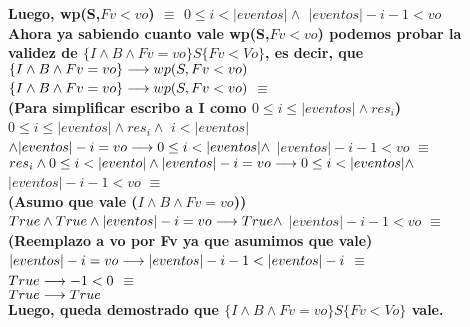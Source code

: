 \documentclass[10pt,a4paper]{article}
\begin{document}
\begin{flushleft}
\begin{enumerate}
	\vspace{2mm}
	\textbf{Luego, wp(S,$Fv<vo$) $\equiv$ $0 \leq i <|eventos| \wedge$ $|eventos|-i-1<vo$}\\
	\vspace{6mm}
	\textbf{Ahora ya sabiendo cuanto vale wp(S,$Fv<vo$) podemos probar la validez de $\{ I \wedge B \wedge Fv= vo \}S\{ Fv<Vo \}$, es decir, que $\{ I \wedge B \wedge Fv= vo \} \longrightarrow wp(S,Fv<vo)$} \\
	\vspace{2mm}
	$\{ I \wedge B \wedge Fv= vo \} \longrightarrow wp(S,Fv<vo)$ $ \equiv$ \\
	\vspace{2mm}
	\textbf{(Para simplificar escribo a I como $0\leq i \leq |eventos| \wedge res_i$)}\\
	\vspace{2mm}
	$0\leq i \leq |eventos| \wedge res_i \wedge $ $i < |eventos|$ $\wedge |eventos|-i = vo \implica 0 \leq i <|eventos| \wedge$ $|eventos|-i-1<vo$ $\equiv$ \\
	\vspace{2mm}
	$res_i \wedge 0\leq i<|evento| \wedge |eventos|-i = vo \implica 0 \leq i <|eventos| \wedge$ $|eventos|-i-1<vo$ $\equiv$ \\
	\vspace{2mm}
	\textbf{(Asumo que vale ($I \wedge B \wedge Fv= vo$))}\\
	\vspace{2mm}
	$True\wedge True \wedge |eventos|-i = vo \longrightarrow True \wedge$ $|eventos|-i-1<vo$ $\equiv$ \\
	\vspace{2mm}
	\textbf{(Reemplazo a vo por Fv ya que asumimos que vale)}\\
	\vspace{2mm}
	$|eventos|-i = vo \implica |eventos|-i-1<|eventos|-i$ $\equiv$ \\
	\vspace{2mm}
	$ True\longrightarrow -1<0 $ $\equiv$ \\
	\vspace{2mm}
	$ True\longrightarrow True $ \\
	\vspace{4mm}
	\textbf{Luego, queda demostrado que $\{ I \wedge B \wedge Fv= vo \}S\{ Fv<Vo \}$ vale.}


\end{enumerate}
\end{flushleft}
\end{document}
